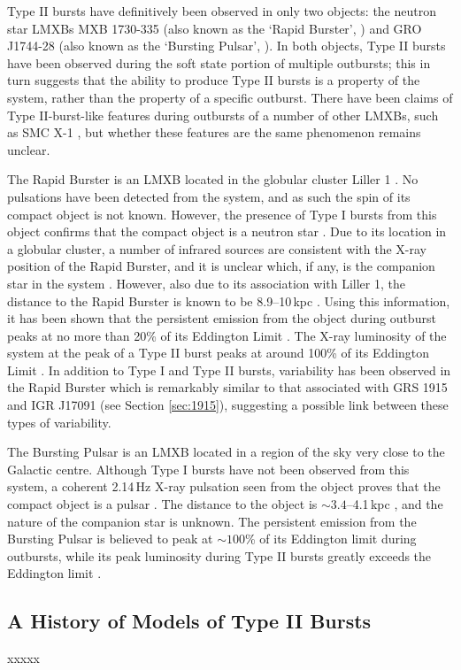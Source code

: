 \par Type II bursts have definitively been observed in only two objects: the neutron star LMXBs MXB 1730-335 (also known as the `Rapid Burster', \citealp{Lewin_TypeII}) and GRO J1744-28 (also known as the `Bursting Pulsar', \citealp{Paciesas_BPDiscovery}).  In both objects, Type II bursts have been observed during the soft state portion of multiple outbursts; this in turn suggests that the ability to produce Type II bursts is a property of the system, rather than the property of a specific outburst.  There have been claims of Type II-burst-like features during outbursts of a number of other LMXBs, such as SMC X-1 \citep{Angelini_SMC}, but whether these features are the same phenomenon remains unclear.
\par The Rapid Burster is an LMXB located in the globular cluster Liller 1 \citep{Lewin_TypeII}.  No pulsations have been detected from the system, and as such the spin of its compact object is not known.  However, the presence of Type I bursts from this object confirms that the compact object is a neutron star \citep{Hoffman_RB}.  Due to its location in a globular cluster, a number of infrared sources are consistent with the X-ray position of the Rapid Burster, and it is unclear which, if any, is the companion star in the system \citep{Homer_RBNoSec}.  However, also due to its association with Liller 1, the distance to the Rapid Burster is known to be 8.9--10\,kpc \citep{Ortolani_LillerD}.  Using this information, it has been shown that the persistent emission from the object during outburst peaks at no more than 20\% of its Eddington Limit \citep{Bagnoli_RB}.  The X-ray luminosity of the system at the peak of a Type II burst peaks at around 100\% of its Eddington Limit \citep{Tan_RBBursts,Bagnoli_PopStudy}.  In addition to Type I and Type II bursts, variability has been observed in the Rapid Burster which is remarkably similar to that associated with GRS 1915 and IGR J17091 (see Section \ref{sec:1915}), suggesting a possible link between these types of variability.
\par The Bursting Pulsar is an LMXB located in a region of the sky very close to the Galactic centre.  Although Type I bursts have not been observed from this system, a coherent 2.14\,Hz X-ray pulsation seen from the object proves that the compact object is a pulsar \citep{Kouveliotou_BPPulse}.  The distance to the object is $\sim3.4$--4.1\,kpc \citep{Sanna_BP}, and the nature of the companion star is unknown.  The persistent emission from the Bursting Pulsar is believed to peak at $\sim100$\% of its Eddington limit during outbursts, while its peak luminosity during Type II bursts greatly exceeds the Eddington limit \citep{Sturner_BPNature}.

\subsection{A History of Models of Type II Bursts}

xxxxx